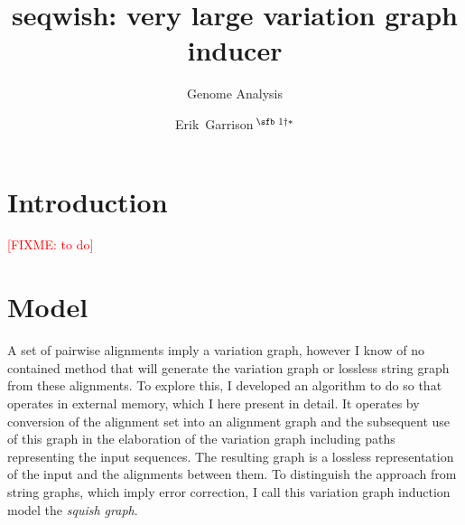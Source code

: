 \documentclass{bioinfo}
\newcommand{\red}[1]{{\textcolor{Red}{#1}}}
\newcommand{\FIXME}[1]{\red{[FIXME: #1]}}
\begin{document}

    \subtitle{Genome Analysis}

    \title[seqwish: very large variation graph inducer]{seqwish: very large variation graph inducer}
    \author[Garrison \textit{et~al}.]{
        Erik~Garrison\,$^{\text{\sfb 1} \dagger*}$
    }

    \address{
        $^{\text{\sf 1}}$University of Tennessee Health Science Center, Memphis, TN, USA
    }





    \maketitle


    \section{Introduction}
    \label{sec:introduction}
    \FIXME{to do}


    \section{Model}
    \label{sec:model}

    A set of pairwise alignments imply a variation graph, however I know of no contained method that will generate the variation graph or lossless string graph from these alignments.
    To explore this, I developed an algorithm to do so that operates in external memory, which I here present in detail.
    It operates by conversion of the alignment set into an alignment graph and the subsequent use of this graph in the elaboration of the variation graph including paths representing the input sequences.
    The resulting graph is a lossless representation of the input and the alignments between them.
    To distinguish the approach from string graphs, which imply error correction, I call this variation graph induction model the \emph{squish graph}.
\end{document}
